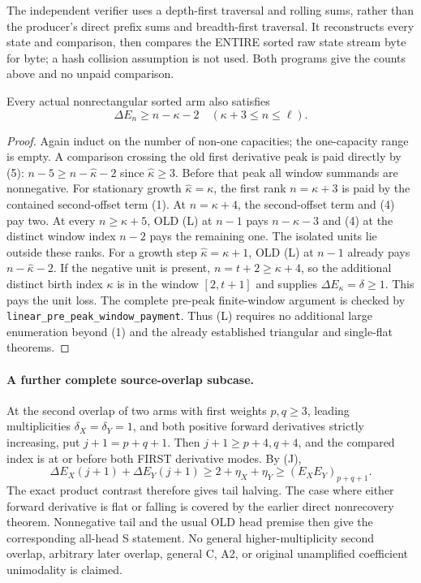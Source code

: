 The independent verifier uses a depth-first traversal and rolling sums,
rather than the producer's direct prefix sums and breadth-first traversal.
It reconstructs every state and comparison, then compares the ENTIRE
sorted raw state stream byte for byte; a hash collision assumption is
not used. Both programs give the counts above and no unpaid comparison.

\begin{theorem}
Every actual nonrectangular sorted arm also satisfies
\[
          \boxed{\Delta E_n\ge n-\kappa-2
                         \quad(\kappa+3\le n\le\ell).}       \tag{L}
\]
\end{theorem}
\begin{proof}
Again induct on the number of non-one capacities; the one-capacity
range is empty. A comparison crossing the old first derivative peak
is paid directly by (5): $n-5\ge n-\widehat\kappa-2$ since
$\widehat\kappa\ge3$.
Before that peak all window summands are nonnegative.
For stationary growth $\widehat\kappa=\kappa$, the first rank
$n=\kappa+3$ is paid by the contained second-offset term (1).
At $n=\kappa+4$, the second-offset term and (4) pay two.
At every $n\ge\kappa+5$, OLD (L) at $n-1$ pays $n-\kappa-3$
and (4) at the distinct window index $n-2$ pays the remaining one.
The isolated units lie outside these ranks.
For a growth step $\widehat\kappa=\kappa+1$, OLD (L) at $n-1$
already pays $n-\widehat\kappa-2$. If the negative unit is present,
$n=t+2\ge\kappa+4$, so the additional distinct birth index
$\kappa$ is in the window $[2,t+1]$ and supplies
$\Delta E_\kappa=\delta\ge1$. This pays the unit loss.
The complete pre-peak finite-window argument is checked by
\texttt{linear\_pre\_peak\_window\_payment}.
Thus (L) requires no additional large enumeration beyond (1) and
the already established triangular and single-flat theorems.
\end{proof}

\paragraph{A further complete source-overlap subcase.}
At the second overlap of two arms with first weights $p,q\ge3$,
leading multiplicities $\delta_X=\delta_Y=1$, and both positive
forward derivatives strictly increasing, put $j+1=p+q+1$.
Then $j+1\ge p+4,q+4$, and the compared index is at or before
both FIRST derivative modes. By (J),
\[
 \Delta E_X(j+1)+\Delta E_Y(j+1)
    \ge2+\eta_X+\eta_Y\ge (E_XE_Y)_{p+q+1}.
\]
The exact product contrast therefore gives tail halving. The case
where either forward derivative is flat or falling is covered by the
earlier direct nonrecovery theorem. Nonnegative tail and the usual
OLD head premise then give the corresponding all-head S statement.
No general higher-multiplicity second overlap, arbitrary later overlap,
general C, A2, or original unamplified coefficient unimodality is claimed.
